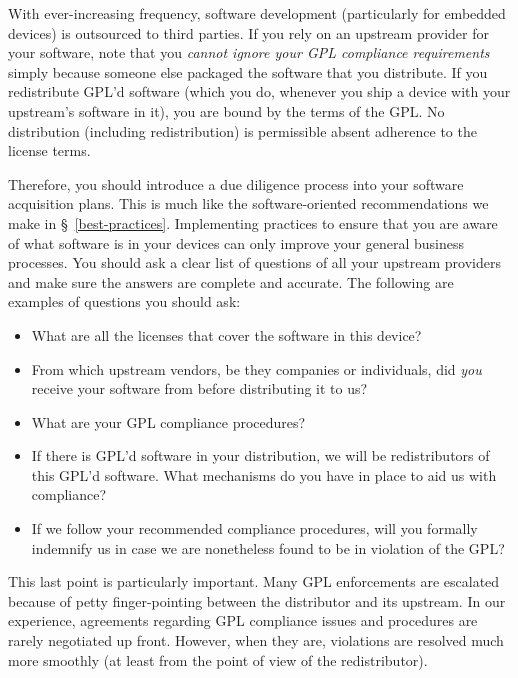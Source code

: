 \documentclass[letterpaper]{fixme}
\begin{document}
With ever-increasing frequency, software development (particularly for
embedded devices) is outsourced to third parties.  If you rely on an
upstream provider for your software, note that you \emph{cannot ignore
  your GPL compliance requirements} simply because someone else packaged
the software that you distribute.  If you redistribute GPL'd software
(which you do, whenever you ship a device with your upstream's software in
it), you are bound by the terms of the GPL\@.  No distribution (including
redistribution) is permissible absent adherence to the license terms.

Therefore, you should introduce a due diligence process into your software
acquisition plans.  This is much like the software-oriented
recommendations we make in \S~\ref{best-practices}.  Implementing
practices to ensure that you are aware of what software is in your devices
can only improve your general business processes.  You should ask a clear
list of questions of all your upstream providers and make sure the answers
are complete and accurate.  The following are examples of questions you
should ask:
\begin{itemize}

\item What are all the licenses that cover the software in this device?

\item From which upstream vendors, be they companies or individuals, did
  \emph{you} receive your software from before distributing it to us?

\item What are your GPL compliance procedures?

\item If there is GPL'd software in your distribution, we will be
  redistributors of this GPL'd software.  What mechanisms do you have in
  place to aid us with compliance?

\item If we follow your recommended compliance procedures, will you
  formally indemnify us in case we are nonetheless found to be in
  violation of the GPL?

\end{itemize}

This last point is particularly important.  Many GPL enforcements are
escalated because of petty finger-pointing between the distributor and its
upstream.  In our experience, agreements regarding GPL compliance issues
and procedures are rarely negotiated up front.  However, when they are,
violations are resolved much more smoothly (at least from the point of
view of the redistributor).
\end{document}
